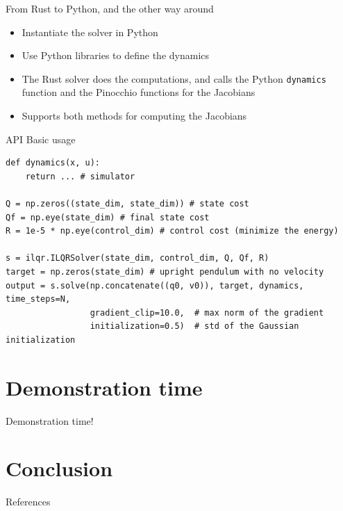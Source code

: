 \documentclass[aspectratio=169,draft]{beamer}
\begin{document}
\begin{frame}{From Rust to Python, and the other way around}
    \begin{itemize}
        \item Instantiate the solver in Python
        \item Use Python libraries to define the dynamics
        \item The Rust solver does the computations, and calls the Python \texttt{dynamics} function and the Pinocchio functions for the Jacobians
        \item Supports both methods for computing the Jacobians
    \end{itemize}
\end{frame}

\begin{frame}[fragile]{API Basic usage}
    \begin{verbatim}
def dynamics(x, u):
    return ... # simulator

Q = np.zeros((state_dim, state_dim)) # state cost
Qf = np.eye(state_dim) # final state cost
R = 1e-5 * np.eye(control_dim) # control cost (minimize the energy)

s = ilqr.ILQRSolver(state_dim, control_dim, Q, Qf, R)
target = np.zeros(state_dim) # upright pendulum with no velocity
output = s.solve(np.concatenate((q0, v0)), target, dynamics, time_steps=N,
                 gradient_clip=10.0,  # max norm of the gradient
                 initialization=0.5)  # std of the Gaussian initialization
\end{verbatim}
\end{frame}

\section{Demonstration time}
\begin{frame}
    \begin{center}
        \huge Demonstration time!
    \end{center}
\end{frame}

\section{Conclusion}
\begin{frame}{References}
    \nocite{*}
    \printbibliography{}
\end{frame}
\end{document}
